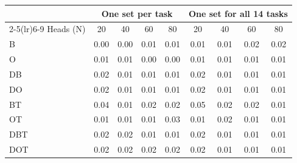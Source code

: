 \begin{tabular}{@{}lcccccccc@{}}
\toprule
 & \multicolumn{4}{c}{One set per task} & \multicolumn{4}{c}{One set for all 14 tasks} \\
\cmidrule(lr){2-5}\cmidrule(lr){6-9}
Heads (N) & 20 & 40 & 60 & 80 & 20 & 40 & 60 & 80 \\
\midrule
B & 0.00 & 0.00 & 0.01 & 0.01 & 0.01 & 0.01 & 0.02 & 0.02 \\
O & 0.01 & 0.01 & 0.00 & 0.00 & 0.01 & 0.01 & 0.01 & 0.01 \\
\addlinespace
DB & 0.02 & 0.01 & 0.01 & 0.01 & 0.02 & 0.01 & 0.01 & 0.01 \\
DO & 0.02 & 0.01 & 0.01 & 0.01 & 0.02 & 0.01 & 0.01 & 0.01 \\
\addlinespace
BT & 0.04 & 0.01 & 0.02 & 0.02 & 0.05 & 0.02 & 0.02 & 0.01 \\
OT & 0.01 & 0.01 & 0.01 & 0.03 & 0.01 & 0.02 & 0.01 & 0.01 \\
\addlinespace
DBT & 0.02 & 0.02 & 0.01 & 0.01 & 0.02 & 0.01 & 0.01 & 0.01 \\
DOT & 0.02 & 0.02 & 0.02 & 0.02 & 0.02 & 0.01 & 0.01 & 0.01 \\
\bottomrule
\end{tabular}
